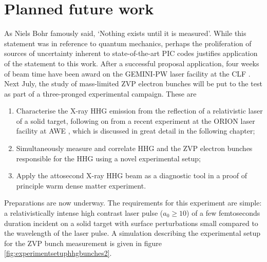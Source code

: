 \section{Planned future work}\label{sec:zvp-future_work}
As Niels Bohr famously said, `Nothing exists until it is measured'. While this statement was in reference to quantum mechanics, perhaps the proliferation of sources of uncertainty inherent to state-of-the-art PIC codes justifies application of the statement to this work. After a successful proposal application, four weeks of beam time have been award on the GEMINI-PW laser facility at the \ac{CLF} \cite{__LaserSystemGemini}. Next July, the study of mass-limited ZVP electron bunches will be put to the test as part of a three-pronged experimental campaign. These are
\begin{enumerate}
	\item Characterise the X-ray \ac{HHG} emission from the reflection of a relativistic laser of a solid target, following on from a recent experiment at the ORION laser facility at AWE \cite{hoppsOverviewLaserSystems2013}, which is discussed in great detail in the following chapter;
	\item Simultaneously measure and correlate \ac{HHG} and the ZVP electron bunches responsible for the \ac{HHG} using a novel experimental setup;
	\item Apply the attosecond X-ray \ac{HHG} beam as a diagnostic tool in a proof of principle warm dense matter experiment.
\end{enumerate}
Preparations are now underway. The requirements for this experiment are simple: a relativistically intense high contrast laser pulse ($a_0 \ge 10$) of a few femtoseconds duration incident on a solid target with surface perturbations small compared to the wavelength of the laser pulse. A simulation describing the experimental setup for the ZVP bunch measurement is given in figure \ref{fig:experimentsetuphhgbunches2}. 
